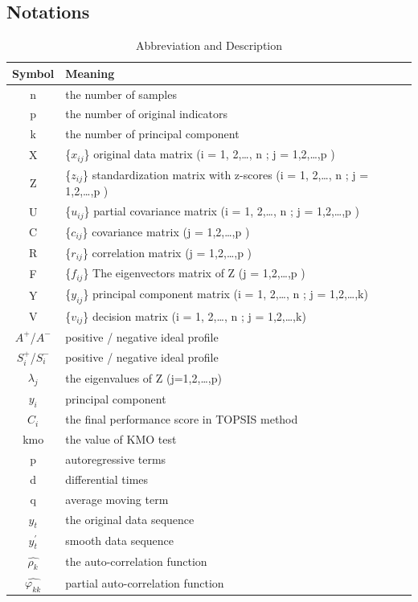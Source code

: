 \documentclass{mcmthesis}
\begin{document}
    \subsection{Notations}
         \begin{table}[!htbp]
            \centering
                \begin{tabular}{c|l}
                  \hline
                  Symbol & Meaning \\
                  \hline
                  n & the number of samples \\
                  p & the number of original indicators \\
                  k & the number of principal component \\
                  X & \{$x_{ij}$\} original data matrix (i = 1, 2,…, n ; j = 1,2,…,p ) \\
                  Z & \{$z_{ij}$\} standardization matrix with z-scores (i = 1, 2,…, n ; j = 1,2,…,p ) \\
                  U & \{$u_{ij}$\} partial covariance matrix (i = 1, 2,…, n ; j = 1,2,…,p ) \\
                  C & \{$c_{ij}$\} covariance matrix (j = 1,2,…,p ) \\
                  R & \{$r_{ij}$\} correlation matrix (j = 1,2,…,p ) \\
                  F & \{$f_{ij}$\} The eigenvectors matrix of Z (j = 1,2,…,p ) \\
                  Y & \{$y_{ij}$\} principal component matrix (i = 1, 2,…, n ; j = 1,2,…,k) \\
                  V & \{$v_{ij}$\} decision matrix (i = 1, 2,…, n ; j = 1,2,…,k) \\
                  $A^+$/$A^-$ & positive / negative ideal profile \\
                  $S_{i}^+$/$S_{i}^-$ & positive / negative ideal profile \\
                  $\lambda_{j}$ & the eigenvalues of Z (j=1,2,…,p) \\
                  $y_{i}$ & principal component \\
                  $C_{i}$ & the final performance score in TOPSIS method \\
                  kmo & the value of KMO test \\
                  p & autoregressive terms \\
                  d & differential times \\
                  q & average moving term \\
                  $y_{t}$ & the original data sequence \\
                  $y_{t}^{'}$ & smooth data sequence \\
                  $\hat{\rho_{k}}$ & the auto-correlation function \\
                  $\hat{\varphi_{kk}}$ & partial auto-correlation function \\
                  \hline
                \end{tabular}
           \caption{Abbreviation and Description}
         \end{table}
\end{document}
